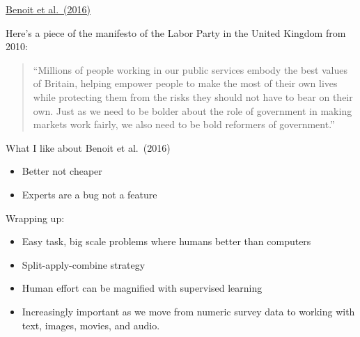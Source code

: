 \documentclass[aspectratio=169]{beamer}
\begin{document}
\begin{frame}

\begin{center}
\end{center}

\vfill
\href{http://dx.doi.org/10.1017/S0003055416000058}{Benoit et al.\ (2016)}

\end{frame}
\begin{frame}

Here's a piece of the manifesto of the Labor Party in the United Kingdom from 2010:

\begin{quote}
``Millions of people working in our public services embody the best values of Britain, helping empower people to make the most of their own lives while protecting them from the risks they should not have to bear on their own. Just as we need to be bolder about the role of government in making markets work fairly, we also need to be bold reformers of government.''
\end{quote}

\end{frame}
\begin{frame}

\begin{center}
\end{center}

\end{frame}
\begin{frame}

What I like about Benoit et al.\ (2016)
\begin{itemize}
\item Better not cheaper
\pause
\item Experts are a bug not a feature
\end{itemize}

\end{frame}
\begin{frame}

Wrapping up:
\begin{itemize}
\item Easy task, big scale problems where humans better than computers
\pause
\item Split-apply-combine strategy
\pause
\item Human effort can be magnified with supervised learning 
\pause
\item Increasingly important as we move from numeric survey data to working with text, images, movies, and audio.
\end{itemize}

\end{frame}
\end{document}
